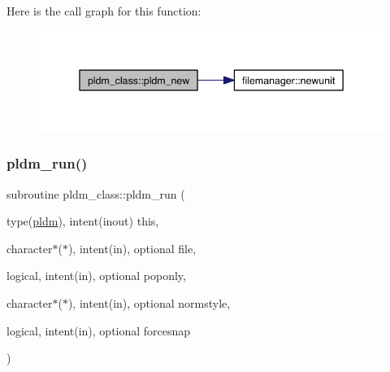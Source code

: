 Here is the call graph for this function\+:\nopagebreak
\begin{figure}[H]
\begin{center}
\leavevmode
\includegraphics[width=342pt]{namespacepldm__class_a12da2274f89c7978903a0e5de4c0a2a7_cgraph}
\end{center}
\end{figure}
\mbox{\label{namespacepldm__class_acb662f59407b2a0bd62fc36aab876482}} 
\subsubsection{\texorpdfstring{pldm\+\_\+run()}{pldm\_run()}}
{\footnotesize\ttfamily subroutine pldm\+\_\+class\+::pldm\+\_\+run (\begin{DoxyParamCaption}\item[{type(\hyperlink{structpldm__class_1_1pldm}{pldm}), intent(inout)}]{this,  }\item[{character$\ast$($\ast$), intent(in), optional}]{file,  }\item[{logical, intent(in), optional}]{poponly,  }\item[{character$\ast$($\ast$), intent(in), optional}]{normstyle,  }\item[{logical, intent(in), optional}]{forcesnap }\end{DoxyParamCaption})\hspace{0.3cm}{\ttfamily [private]}}

